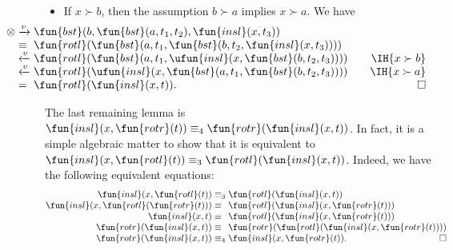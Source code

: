 \begin{itemize}
  \item If \(x \succ b\), then the assumption \(b \succ a\) implies
    \(x \succ a\). We have
  \begin{equation*}
    \hspace*{-25mm}
  \begin{array}{@{}r@{\;}l@{\;}l@{\qquad}r@{}}
    \otimes & \xrightarrow{\smash{\upsilon}} &
    \fun{bst}(b,\fun{bst}(a,t_1,t_2),\fun{insl}(x,t_3))\\
    & \equiv &
    \fun{rotl}(\fun{bst}(a,t_1,\fun{bst}(b,t_2,\fun{insl}(x,t_3))))\\
    & \xleftarrow{\smash{\upsilon}} &
    \fun{rotl}(\fun{bst}(a,t_1,\ufun{insl}(x,\fun{bst}(b,t_2,t_3))))
    & \IH{x \succ b}\\
    & \xleftarrow{\smash{\upsilon}} &
    \fun{rotl}(\ufun{insl}(x,\fun{bst}(a,t_1,\fun{bst}(b,t_2,t_3))))
    & \IH{x \succ a}\\
    & = & \fun{rotl}(\fun{insl}(x,t)). & \hfill\Box
  \end{array}
  \end{equation*}

\end{itemize}

The last remaining lemma is \(\fun{insl}(x,\fun{rotr}(t)) \equiv_4
\fun{rotr}(\fun{insl}(x,t))\). In fact, it is a simple algebraic
matter to show that it is equivalent to \(\fun{insl}(x,\fun{rotl}(t))
\equiv_3 \fun{rotl}(\fun{insl}(x,t))\). Indeed, we have the following
equivalent equations:
\begin{equation*}
\begin{array}{@{}r@{\;}l@{\;}l@{}}
\fun{insl}(x,\fun{rotl}(t)) & \equiv_3 & \fun{rotl}(\fun{insl}(x,t))\\
\fun{insl}(x,\fun{rotl}(\fun{rotr}(t))) & \equiv &
\fun{rotl}(\fun{insl}(x,\fun{rotr}(t)))\\
\fun{insl}(x,t) & \equiv & \fun{rotl}(\fun{insl}(x,\fun{rotr}(t)))\\
\fun{rotr}(\fun{insl}(x,t)) & \equiv &
\fun{rotr}(\fun{rotl}(\fun{insl}(x,\fun{rotr}(t))))\\
\fun{rotr}(\fun{insl}(x,t)) & \equiv_4 &
\fun{insl}(x,\fun{rotr}(t)).\hfill\Box
\end{array}
\end{equation*}



